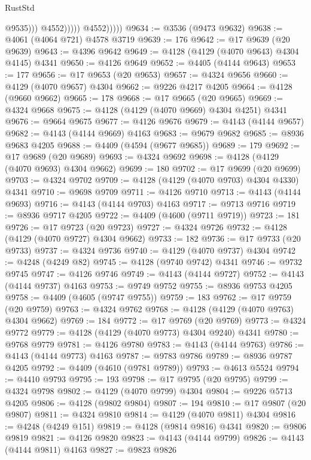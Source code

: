 \begin{lexlean}{RustStd}
\begin{coremodule}
                              @9535)))
                        @4552)))))
              @4552)))))
@9634 := @3536 (@9473 @9632)
@9638 := @4061 (@4064 @721) @4578 @3719
@9639 := 176
@9642 := @17 @9639 (@20 @9639)
@9643 := @4396 @9642
@9649 := @4128 (@4129 (@4070 @9643) @4304 @4145) @4341
@9650 := @4126 @9649
@9652 := @4405 (@4144 @9643)
@9653 := 177
@9656 := @17 @9653 (@20 @9653)
@9657 := @4324 @9656
@9660 := @4129 (@4070 @9657) @4304
@9662 := @9226 @4217 @4205
@9664 := @4128 (@9660 @9662)
@9665 := 178
@9668 := @17 @9665 (@20 @9665)
@9669 := @4324 @9668
@9675 := @4128 (@4129 (@4070 @9669) @4304 @4251) @4341
@9676 := @9664 @9675
@9677 := @4126 @9676
@9679 := @4143 (@4144 @9657)
@9682 := @4143 (@4144 @9669) @4163
@9683 := @9679 @9682
@9685 := @8936 @9683 @4205
@9688 := @4409 (@4594 (@9677 @9685))
@9689 := 179
@9692 := @17 @9689 (@20 @9689)
@9693 := @4324 @9692
@9698 := @4128 (@4129 (@4070 @9693) @4304 @9662)
@9699 := 180
@9702 := @17 @9699 (@20 @9699)
@9703 := @4324 @9702
@9709 := @4128 (@4129 (@4070 @9703) @4304 @4330) @4341
@9710 := @9698 @9709
@9711 := @4126 @9710
@9713 := @4143 (@4144 @9693)
@9716 := @4143 (@4144 @9703) @4163
@9717 := @9713 @9716
@9719 := @8936 @9717 @4205
@9722 := @4409 (@4600 (@9711 @9719))
@9723 := 181
@9726 := @17 @9723 (@20 @9723)
@9727 := @4324 @9726
@9732 := @4128 (@4129 (@4070 @9727) @4304 @9662)
@9733 := 182
@9736 := @17 @9733 (@20 @9733)
@9737 := @4324 @9736
@9740 := @4129 (@4070 @9737) @4304
@9742 := @4248 (@4249 @82)
@9745 := @4128 (@9740 @9742) @4341
@9746 := @9732 @9745
@9747 := @4126 @9746
@9749 := @4143 (@4144 @9727)
@9752 := @4143 (@4144 @9737) @4163
@9753 := @9749 @9752
@9755 := @8936 @9753 @4205
@9758 := @4409 (@4605 (@9747 @9755))
@9759 := 183
@9762 := @17 @9759 (@20 @9759)
@9763 := @4324 @9762
@9768 := @4128 (@4129 (@4070 @9763) @4304 @9662)
@9769 := 184
@9772 := @17 @9769 (@20 @9769)
@9773 := @4324 @9772
@9779 := @4128 (@4129 (@4070 @9773) @4304 @9240) @4341
@9780 := @9768 @9779
@9781 := @4126 @9780
@9783 := @4143 (@4144 @9763)
@9786 := @4143 (@4144 @9773) @4163
@9787 := @9783 @9786
@9789 := @8936 @9787 @4205
@9792 := @4409 (@4610 (@9781 @9789))
@9793 := @4613 @5524
@9794 := @4410 @9793
@9795 := 193
@9798 := @17 @9795 (@20 @9795)
@9799 := @4324 @9798
@9802 := @4129 (@4070 @9799) @4304
@9804 := @9226 @5713 @4205
@9806 := @4128 (@9802 @9804)
@9807 := 194
@9810 := @17 @9807 (@20 @9807)
@9811 := @4324 @9810
@9814 := @4129 (@4070 @9811) @4304
@9816 := @4248 (@4249 @151)
@9819 := @4128 (@9814 @9816) @4341
@9820 := @9806 @9819
@9821 := @4126 @9820
@9823 := @4143 (@4144 @9799)
@9826 := @4143 (@4144 @9811) @4163
@9827 := @9823 @9826

\end{coremodule}
\end{lexlean}
